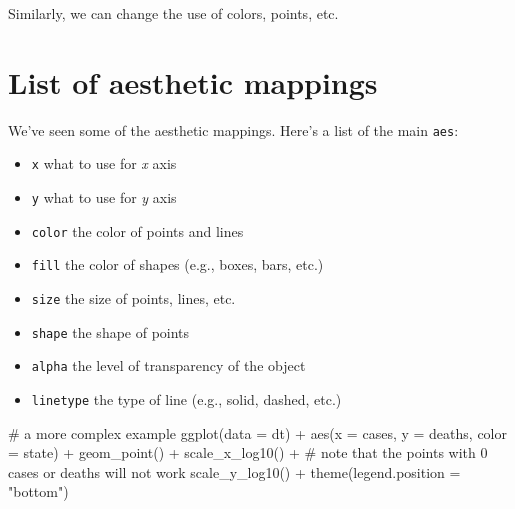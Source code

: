 \documentclass[
  letterpaper,
  DIV=11,
  numbers=noendperiod]{scrreprt}
\newenvironment{Shaded}{\begin{snugshade}}{\end{snugshade}}
\newcommand{\AttributeTok}[1]{\textcolor[rgb]{0.40,0.45,0.13}{#1}}
\newcommand{\CommentTok}[1]{\textcolor[rgb]{0.37,0.37,0.37}{#1}}
\newcommand{\FunctionTok}[1]{\textcolor[rgb]{0.28,0.35,0.67}{#1}}
\newcommand{\NormalTok}[1]{\textcolor[rgb]{0.00,0.23,0.31}{#1}}
\newcommand{\SpecialCharTok}[1]{\textcolor[rgb]{0.37,0.37,0.37}{#1}}
\newcommand{\StringTok}[1]{\textcolor[rgb]{0.13,0.47,0.30}{#1}}
\providecommand{\tightlist}{%
  \setlength{\itemsep}{0pt}\setlength{\parskip}{0pt}}\usepackage{longtable,booktabs,array}
\begin{document}
Similarly, we can change the use of colors, points, etc.

\hypertarget{list-of-aesthetic-mappings}{%
\section{List of aesthetic mappings}\label{list-of-aesthetic-mappings}}

We've seen some of the aesthetic mappings. Here's a list of the main
\texttt{aes}:

\begin{itemize}
\tightlist
\item
  \texttt{x} what to use for \emph{x} axis
\item
  \texttt{y} what to use for \emph{y} axis
\item
  \texttt{color} the color of points and lines
\item
  \texttt{fill} the color of shapes (e.g., boxes, bars, etc.)
\item
  \texttt{size} the size of points, lines, etc.
\item
  \texttt{shape} the shape of points
\item
  \texttt{alpha} the level of transparency of the object
\item
  \texttt{linetype} the type of line (e.g., solid, dashed, etc.)
\end{itemize}

\begin{Shaded}
\begin{Highlighting}[]
\CommentTok{\# a more complex example}
\FunctionTok{ggplot}\NormalTok{(}\AttributeTok{data =}\NormalTok{ dt) }\SpecialCharTok{+} 
  \FunctionTok{aes}\NormalTok{(}\AttributeTok{x =}\NormalTok{ cases, }\AttributeTok{y =}\NormalTok{ deaths, }
          \AttributeTok{color =}\NormalTok{ state) }\SpecialCharTok{+}
  \FunctionTok{geom\_point}\NormalTok{() }\SpecialCharTok{+} 
  \FunctionTok{scale\_x\_log10}\NormalTok{() }\SpecialCharTok{+} \CommentTok{\# note that the points with 0 cases or deaths will not work}
  \FunctionTok{scale\_y\_log10}\NormalTok{() }\SpecialCharTok{+}
  \FunctionTok{theme}\NormalTok{(}\AttributeTok{legend.position =} \StringTok{"bottom"}\NormalTok{)}
\end{Highlighting}
\end{Shaded}
\end{document}
